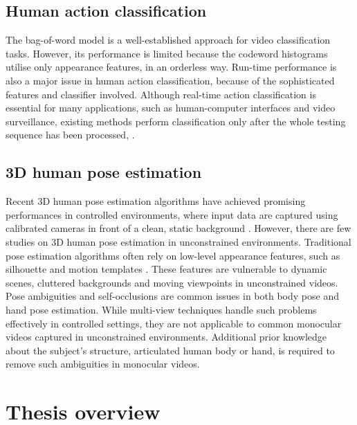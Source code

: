 \subsection{Human action classification}


The bag-of-word model is a well-established approach for video classification tasks. However, its performance is limited because the codeword histograms utilise only appearance features, in an orderless way. Run-time performance is also a major issue in human action classification, because of the sophisticated features and classifier involved. Although real-time action classification is essential for many applications, such as human-computer interfaces and video surveillance, existing methods perform classification only after the whole testing sequence has been processed, \eg \cite{Schuldt2004, Dollar2005, Riemenschneider2009, Niebles2008, Wong2007}. 

\subsection{3D human pose estimation} 


Recent 3D human pose estimation algorithms have achieved promising performances in controlled environments, where input data are captured using calibrated cameras in front of a clean, static background \cite{Rogez2012, Pons-Moll2011, Sigal2012}. 
However, there are few studies on 3D human pose estimation in unconstrained environments.  
Traditional pose estimation algorithms often rely on low-level appearance features, such as silhouette and motion templates \cite{Bissacco2007, Rogez2012, Ionescu2011, Navaratnam2006}. These features are vulnerable to dynamic scenes, cluttered backgrounds and moving viewpoints in unconstrained videos. 
Pose ambiguities and self-occlusions are common issues in both body pose and hand pose estimation. While multi-view techniques handle such problems effectively in controlled settings, they are not applicable to common monocular videos captured in unconstrained environments. Additional prior knowledge about the subject's structure, \eg articulated human body or hand, is required to remove such ambiguities in monocular videos. 

\section{Thesis overview}

